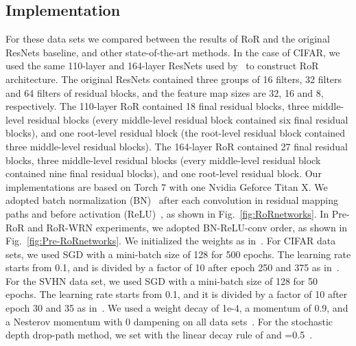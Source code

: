 \documentclass[journal]{IEEEtran}
\begin{document}
\subsection{Implementation}
For these data sets we compared between the results of RoR and the original ResNets baseline, and other state-of-the-art methods. In the case of CIFAR, we used the same 110-layer and 164-layer ResNets used by~\cite{he2015resnets} to construct RoR architecture. The original ResNets contained three groups of 16 filters, 32 filters and 64 filters of residual blocks, and the feature map sizes are 32, 16 and 8, respectively. The 110-layer RoR contained 18 final residual blocks, three middle-level residual blocks (every middle-level residual block contained six final residual blocks), and one root-level residual block (the root-level residual block contained three middle-level residual blocks). The 164-layer RoR contained 27 final residual blocks, three middle-level residual blocks (every middle-level residual block contained nine final residual blocks), and one root-level residual block. Our implementations are based on Torch 7 with one Nvidia Geforce Titan X. We adopted batch normalization (BN)~\cite{ioffe2015bn} after each convolution in residual mapping paths and before activation (ReLU)~\cite{nair2010relu}, as shown in Fig.~\ref{fig:RoRnetworks}. In Pre-RoR and RoR-WRN experiments, we adopted BN-ReLU-conv order, as shown in Fig.~\ref{fig:Pre-RoRnetworks}. We initialized the weights as in~\cite{he2015prelu}. For CIFAR data sets, we used SGD with a mini-batch size of 128 for 500 epochs. The learning rate starts from 0.1, and is divided by a factor of 10 after epoch 250 and 375 as in~\cite{huang2016SD}. For the SVHN data set, we used SGD with a mini-batch size of 128 for 50 epochs. The learning rate starts from 0.1, and it is divided by a factor of 10 after epoch 30 and 35 as in~\cite{huang2016SD}. We used a weight decay of 1e-4, a momentum of 0.9, and a Nesterov momentum with 0 dampening on all data sets~\cite{gross2016facebookres}. For the stochastic depth drop-path method, we set  with the linear decay rule of  and =0.5~\cite{huang2016SD}. 
\end{document}
